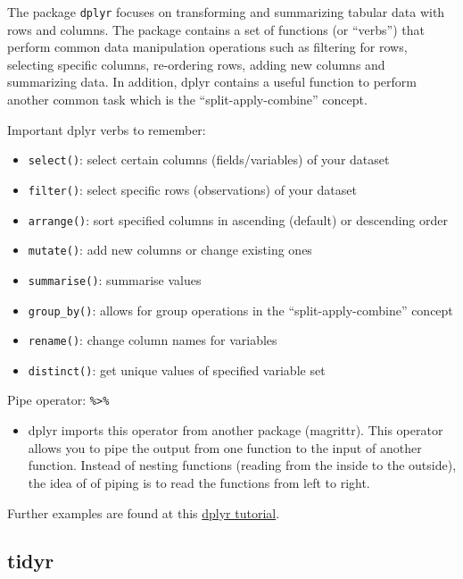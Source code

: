 \documentclass[
]{book}
\providecommand{\tightlist}{%
  \setlength{\itemsep}{0pt}\setlength{\parskip}{0pt}}
\begin{document}
The package \texttt{dplyr} focuses on transforming and summarizing tabular data with rows and columns. The package contains a set of functions (or ``verbs'') that perform common data manipulation operations such as filtering for rows, selecting specific columns, re-ordering rows, adding new columns and summarizing data. In addition, dplyr contains a useful function to perform another common task which is the ``split-apply-combine'' concept.

Important dplyr verbs to remember:

\begin{itemize}
\tightlist
\item
  \texttt{select()}: select certain columns (fields/variables) of your dataset
\item
  \texttt{filter()}: select specific rows (observations) of your dataset
\item
  \texttt{arrange()}: sort specified columns in ascending (default) or descending order\\
\item
  \texttt{mutate()}: add new columns or change existing ones
\item
  \texttt{summarise()}: summarise values
\item
  \texttt{group\_by()}: allows for group operations in the ``split-apply-combine'' concept
\item
  \texttt{rename()}: change column names for variables
\item
  \texttt{distinct()}: get unique values of specified variable set
\end{itemize}

Pipe operator: \texttt{\%\textgreater{}\%}

\begin{itemize}
\tightlist
\item
  dplyr imports this operator from another package (magrittr). This operator allows you to pipe the output from one function to the input of another function. Instead of nesting functions (reading from the inside to the outside), the idea of of piping is to read the functions from left to right.
\end{itemize}

Further examples are found at this \href{http://genomicsclass.github.io/book/pages/dplyr_tutorial.html}{dplyr tutorial}.

\hypertarget{tidyr}{%
\subsection{tidyr}\label{tidyr}}
\end{document}
